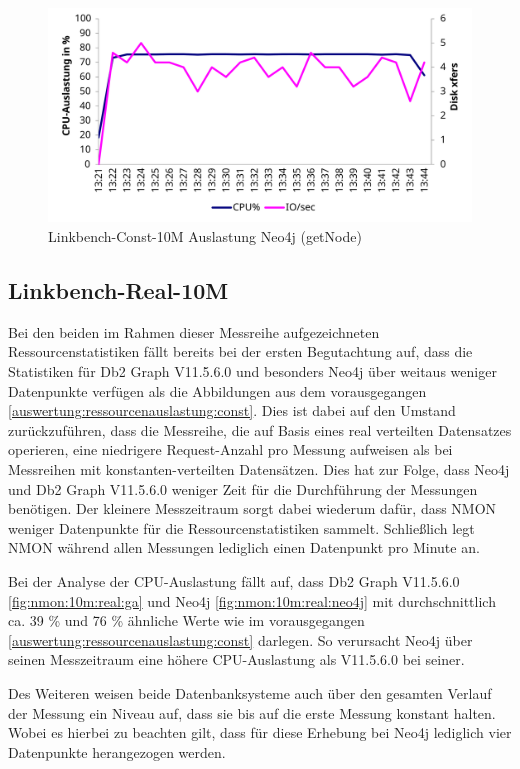 \begin{figure}[!ht]
    \centering
    \includegraphics[width=\textwidth]{images/stats/linkbench-10m-const_neo4j.pdf}
    \caption{Linkbench-Const-10M Auslastung Neo4j (getNode)}
    \label{fig:nmon:10m:const:neo4j}
\end{figure}

\subsection{Linkbench-Real-10M}
\label{auswertung:ressourcenauslastung:real}
Bei den beiden im Rahmen dieser Messreihe aufgezeichneten Ressourcenstatistiken fällt bereits bei der ersten Begutachtung auf, dass die Statistiken für Db2 Graph V11.5.6.0 und besonders Neo4j über weitaus weniger Datenpunkte verfügen als die Abbildungen aus dem vorausgegangen \autoref{auswertung:ressourcenauslastung:const}. Dies ist dabei auf den Umstand zurückzuführen, dass die Messreihe, die auf Basis eines real verteilten Datensatzes operieren, eine niedrigere Request-Anzahl pro Messung aufweisen als bei Messreihen mit konstanten-verteilten Datensätzen. Dies hat zur Folge, dass Neo4j und Db2 Graph V11.5.6.0 weniger Zeit für die Durchführung der Messungen benötigen. Der kleinere Messzeitraum sorgt dabei wiederum dafür, dass NMON weniger Datenpunkte für die Ressourcenstatistiken sammelt. Schließlich legt NMON während allen Messungen lediglich einen Datenpunkt pro Minute an. 

Bei der Analyse der CPU-Auslastung fällt auf, dass Db2 Graph V11.5.6.0 \autoref{fig:nmon:10m:real:ga} und Neo4j \autoref{fig:nmon:10m:real:neo4j} mit durchschnittlich ca. 39 \% und 76 \% ähnliche Werte wie im vorausgegangen \autoref{auswertung:ressourcenauslastung:const} darlegen. So verursacht Neo4j über seinen Messzeitraum eine höhere CPU-Auslastung als V11.5.6.0 bei seiner.   

Des Weiteren weisen beide Datenbanksysteme auch über den gesamten Verlauf der Messung ein Niveau auf, dass sie bis auf die erste Messung konstant halten. Wobei es hierbei zu beachten gilt, dass für diese Erhebung bei Neo4j lediglich vier Datenpunkte herangezogen werden.

